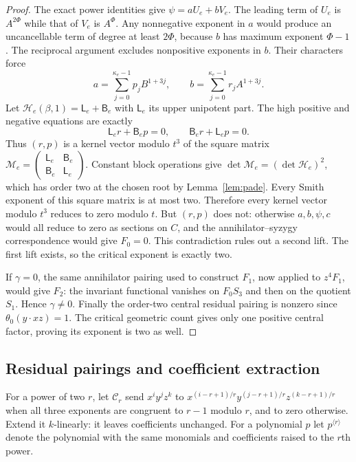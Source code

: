 \documentclass[11pt,a4paper,reqno]{amsart}
\numberwithin{equation}{section}
\theoremstyle{plain}
\theoremstyle{definition}
\theoremstyle{remark}
\begin{document}
\begin{proof}
The exact power identities give $\psi=aU_e+bV_e$. The leading term of $U_e$ is
$A^{2\Phi}$ while that of $V_e$ is $A^\Phi$. Any nonnegative exponent in $a$ would
produce an uncancellable term of degree at least $2\Phi$, because $b$ has maximum
exponent $\Phi-1$. The reciprocal argument excludes nonpositive exponents in $b$.
Their characters force
\[
a=\sum_{j=0}^{\kappa_e-1}p_jB^{1+3j},\qquad
b=\sum_{j=0}^{\kappa_e-1}r_jA^{1+3j}.
\]
Let $\mathcal H_e(\beta,1)=\mathsf L_e+\mathsf B_e$ with $\mathsf L_e$ its upper
unipotent part. The high positive and negative equations are exactly
\[
\mathsf L_er+\mathsf B_ep=0,\qquad \mathsf B_er+\mathsf L_ep=0.
\]
Thus $(r,p)$ is a kernel vector modulo $t^3$ of the square matrix
$\mathcal M_e=\left(\begin{smallmatrix}\mathsf L_e&\mathsf B_e\\\mathsf B_e&\mathsf L_e\end{smallmatrix}\right)$.
Constant block operations give $\det\mathcal M_e=(\det \mathcal H_e)^2$, which has
order two at the chosen root by Lemma~\ref{lem:pade}. Every Smith exponent of this
square matrix is at most two. Therefore every kernel vector modulo $t^3$ reduces to
zero modulo $t$. But $(r,p)$ does not: otherwise $a,b,\psi,c$ would all reduce to
zero as sections on $C$, and the annihilator--syzygy correspondence would give
$F_0=0$. This contradiction rules out a second lift. The first lift exists, so the
critical exponent is exactly two.

If $\gamma=0$, the same annihilator pairing used to construct $F_1$, now applied to
$z^4F_1$, would give $F_2$: the invariant functional vanishes on $F_0S_3$ and then on
the quotient $S_1$. Hence $\gamma\ne0$. Finally the order-two central residual
pairing is nonzero since $\theta_0(y\cdot xz)=1$. The critical geometric count gives
only one positive central factor, proving its exponent is two as well.
\end{proof}

\subsection{Residual pairings and coefficient extraction}
For a power of two $r$, let $\mathcal C_r$ send $x^iy^jz^k$ to
$x^{(i-r+1)/r}y^{(j-r+1)/r}z^{(k-r+1)/r}$ when all three exponents are congruent to
$r-1$ modulo $r$, and to zero otherwise. Extend it $k$-linearly: it leaves
coefficients unchanged. For a polynomial $p$ let $p^{\langle r\rangle}$ denote the
polynomial with the same monomials and coefficients raised to the $r$th power.
\end{document}
